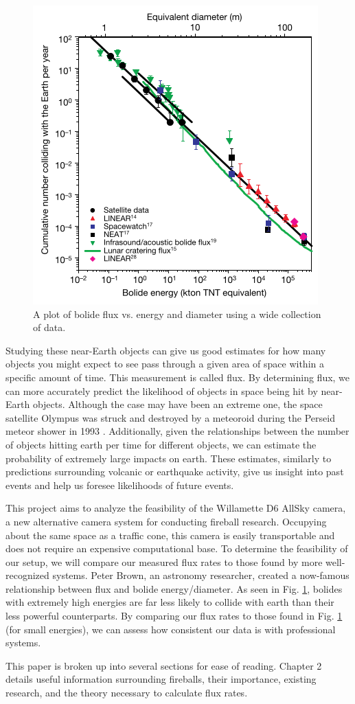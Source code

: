 \begin{figure}[ht!]
  \centering
  \includegraphics[scale=0.9]{images/flux_brown.png}
  \caption{A plot of bolide flux vs. energy and diameter using a wide collection of data.}
  \label{brown}
\end{figure}

Studying these near-Earth objects can give us good estimates for how many objects you might expect to see pass through a given area of space within a specific amount of time.
This measurement is called flux.
By determining flux, we can more accurately predict the likelihood of objects in space being hit by near-Earth objects. 
Although the case may have been an extreme one, the space satellite Olympus was struck and destroyed by a meteoroid during the Perseid meteor shower in 1993 \cite{bobrowsky_comet/asteroid_nodate}.
Additionally, given the relationships between the number of objects hitting earth per time for different objects, we can estimate the probability of extremely large impacts on earth.
These estimates, similarly to predictions surrounding volcanic or earthquake activity, give us insight into past events and help us foresee likelihoods of future events.

This project aims to analyze the feasibility of the Willamette D6 AllSky camera, a new alternative camera system for conducting fireball research. 
Occupying about the same space as a traffic cone, this camera is easily transportable and does not require an expensive computational base.
To determine the feasibility of our setup, we will compare our measured flux rates to those found by more well-recognized systems.
Peter Brown, an astronomy researcher, created a now-famous relationship between flux and bolide energy/diameter. 
As seen in Fig. \ref{brown}, bolides with extremely high energies are far less likely to collide with earth than their less powerful counterparts.
By comparing our flux rates to those found in Fig. \ref{brown} (for small energies), we can assess how consistent our data is with professional systems.

This paper is broken up into several sections for ease of reading. Chapter 2 details useful information surrounding fireballs, their importance, existing research, and the theory necessary to calculate flux rates.
